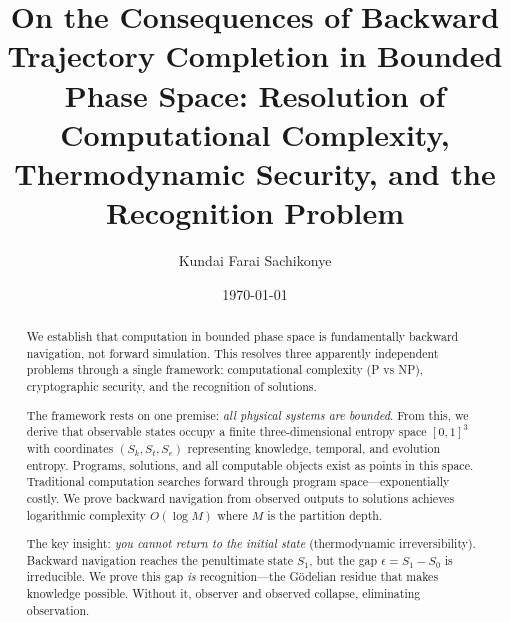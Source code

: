 \documentclass[twocolumn,10pt]{article}
\theoremstyle{definition}
\theoremstyle{remark}
\newcommand{\Sk}{S_k}
\newcommand{\St}{S_t}
\newcommand{\Se}{S_e}
\begin{document}
\title{\vspace{-1cm}\textbf{On the Consequences of Backward Trajectory Completion in Bounded Phase Space: Resolution of Computational Complexity, Thermodynamic Security, and the Recognition Problem}}

\author[1]{Kundai Farai Sachikonye}

\date{\today}

\maketitle

\begin{abstract}
\noindent We establish that computation in bounded phase space is fundamentally backward navigation, not forward simulation. This resolves three apparently independent problems through a single framework: computational complexity (P vs NP), cryptographic security, and the recognition of solutions.

\vspace{0.2cm}
\noindent The framework rests on one premise: \textit{all physical systems are bounded}. From this, we derive that observable states occupy a finite three-dimensional entropy space $[0,1]^3$ with coordinates $(\Sk, \St, \Se)$ representing knowledge, temporal, and evolution entropy. Programs, solutions, and all computable objects exist as points in this space. Traditional computation searches forward through program space—exponentially costly. We prove backward navigation from observed outputs to solutions achieves logarithmic complexity $O(\log M)$ where $M$ is the partition depth.

\vspace{0.2cm}
\noindent The key insight: \textit{you cannot return to the initial state} (thermodynamic irreversibility). Backward navigation reaches the penultimate state $S_1$, but the gap $\epsilon = S_1 - S_0$ is irreducible. We prove this gap \textit{is} recognition—the Gödelian residue that makes knowledge possible. Without it, observer and observed collapse, eliminating observation.


\end{abstract}
\end{document}
